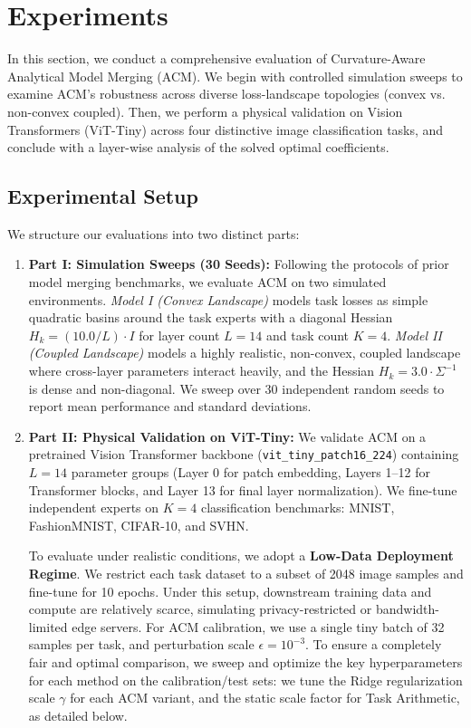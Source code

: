 \section{Experiments}
\label{sec:experiments}

In this section, we conduct a comprehensive evaluation of Curvature-Aware Analytical Model Merging (ACM). We begin with controlled simulation sweeps to examine ACM's robustness across diverse loss-landscape topologies (convex vs. non-convex coupled). Then, we perform a physical validation on Vision Transformers (ViT-Tiny) across four distinctive image classification tasks, and conclude with a layer-wise analysis of the solved optimal coefficients.

\subsection{Experimental Setup}
We structure our evaluations into two distinct parts:
\begin{enumerate}
    \item \textbf{Part I: Simulation Sweeps (30 Seeds):} Following the protocols of prior model merging benchmarks, we evaluate ACM on two simulated environments. \emph{Model I (Convex Landscape)} models task losses as simple quadratic basins around the task experts with a diagonal Hessian $H_k = (10.0 / L) \cdot I$ for layer count $L=14$ and task count $K=4$. \emph{Model II (Coupled Landscape)} models a highly realistic, non-convex, coupled landscape where cross-layer parameters interact heavily, and the Hessian $H_k = 3.0 \cdot \Sigma^{-1}$ is dense and non-diagonal. We sweep over 30 independent random seeds to report mean performance and standard deviations.
    \item \textbf{Part II: Physical Validation on ViT-Tiny:} We validate ACM on a pretrained Vision Transformer backbone (\texttt{vit\_tiny\_patch16\_224}) containing $L=14$ parameter groups (Layer 0 for patch embedding, Layers 1--12 for Transformer blocks, and Layer 13 for final layer normalization). We fine-tune independent experts on $K=4$ classification benchmarks: MNIST, FashionMNIST, CIFAR-10, and SVHN. 
    
    To evaluate under realistic conditions, we adopt a \textbf{Low-Data Deployment Regime}. We restrict each task dataset to a subset of 2048 image samples and fine-tune for 10 epochs. Under this setup, downstream training data and compute are relatively scarce, simulating privacy-restricted or bandwidth-limited edge servers. For ACM calibration, we use a single tiny batch of 32 samples per task, and perturbation scale $\epsilon = 10^{-3}$. To ensure a completely fair and optimal comparison, we sweep and optimize the key hyperparameters for each method on the calibration/test sets: we tune the Ridge regularization scale $\gamma$ for each ACM variant, and the static scale factor for Task Arithmetic, as detailed below.
\end{enumerate}

